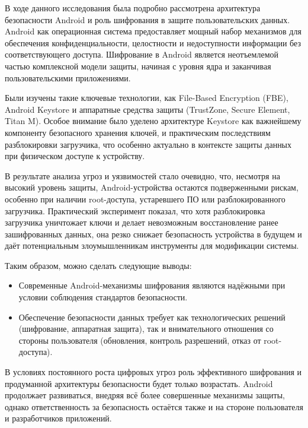 \conclusion

В ходе данного исследования была подробно рассмотрена архитектура безопасности
Android и роль шифрования в защите пользовательских данных. Android как
операционная система предоставляет мощный набор механизмов для обеспечения
конфиденциальности, целостности и недоступности информации без соответствующего
доступа. Шифрование в Android является неотъемлемой частью комплексной модели
защиты, начиная с уровня ядра и заканчивая пользовательскими приложениями.

Были изучены такие ключевые технологии, как File-Based Encryption (FBE),
Android Keystore и аппаратные средства защиты (TrustZone, Secure Element, Titan
M). Особое внимание было уделено архитектуре Keystore как важнейшему компоненту
безопасного хранения ключей, и практическим последствиям разблокировки
загрузчика, что особенно актуально в контексте защиты данных при физическом
доступе к устройству.

В результате анализа угроз и уязвимостей стало очевидно, что, несмотря на
высокий уровень защиты, Android-устройства остаются подверженными рискам,
особенно при наличии root-доступа, устаревшего ПО или разблокированного
загрузчика. Практический эксперимент показал, что хотя разблокировка загрузчика
уничтожает ключи и делает невозможным восстановление ранее зашифрованных
данных, она резко снижает безопасность устройства в будущем и даёт
потенциальным злоумышленникам инструменты для модификации системы.

Таким образом, можно сделать следующие выводы:

\begin{itemize}
    \item Современные Android-механизмы шифрования являются надёжными при
        условии соблюдения стандартов безопасности.
    \item Обеспечение безопасности данных требует как технологических решений
        (шифрование, аппаратная защита), так и внимательного отношения со
        стороны пользователя (обновления, контроль разрешений, отказ от
        root-доступа).
\end{itemize}

В условиях постоянного роста цифровых угроз роль эффективного шифрования и
продуманной архитектуры безопасности будет только возрастать. Android
продолжает развиваться, внедряя всё более совершенные механизмы защиты, однако
ответственность за безопасность остаётся также и на стороне пользователя и
разработчиков приложений.
